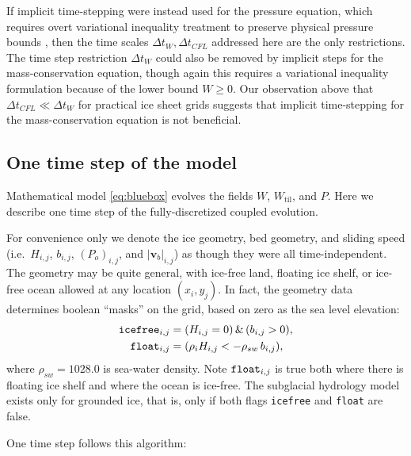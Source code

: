 \documentclass[gmd]{copernicus}   %
\newcommand{\text}{\textrm}
\newcommand\bv{\mathbf{v}}
\newcommand{\Wtil}{W_{\text{til}}}
\begin{document}
If implicit time-stepping were instead used for the pressure equation, which requires overt variational inequality treatment to preserve physical pressure bounds \citep{Schoofetal2012}, then the time scales $\Delta t_W, \Delta t_{CFL}$ addressed here are the only restrictions.  The time step restriction $\Delta t_W$ could also be removed by implicit steps for the mass-conservation equation, though again this requires a variational inequality formulation because of the lower bound $W\ge 0$.  Our observation above that $\Delta t_{CFL} \ll \Delta t_W$ for practical ice sheet grids suggests that implicit time-stepping for the mass-conservation equation is not beneficial.

\subsection{One time step of the model}  \label{subsec:onestep}  Mathematical model \eqref{eq:bluebox} evolves the fields $W$, $\Wtil$, and $P$.  Here we describe one time step of the fully-discretized coupled evolution.

For convenience only we denote the ice geometry, bed geometry, and sliding speed (i.e.~$H_{i,j}$, $b_{i,j}$, $(P_o)_{i,j}$, and $|\bv_b|_{i,j}$) as though they were all time-independent.  The geometry may be quite general, with ice-free land, floating ice shelf, or ice-free ocean allowed at any location $(x_i,y_j)$.  In fact, the geometry data determines boolean ``masks'' on the grid, based on zero as the sea level elevation:
\begin{align*}
\text{\texttt{icefree}}_{i,j} &= (H_{i,j} = 0)\, \&\, (b_{i,j} > 0), \\
\text{\texttt{float}}_{i,j}   &= (\rho_i H_{i,j} < - \rho_{sw}\, b_{i,j}),
\end{align*}
where $\rho_{sw}=1028.0$ is sea-water density.  Note $\text{\texttt{float}}_{i,j}$ is true both where there is floating ice shelf and where the ocean is ice-free.  The subglacial hydrology model exists only for grounded ice, that is, only if both flags \texttt{icefree} and \texttt{float} are false.

One time step follows this algorithm:
\end{document}
